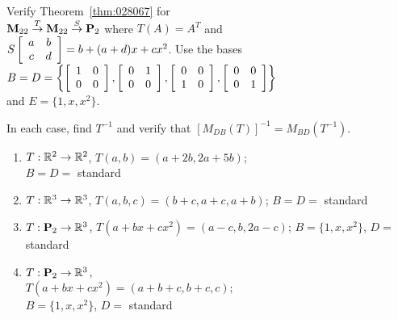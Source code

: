 \begin{multicols}{1}
\begin{ex}
Verify Theorem~\ref{thm:028067} for \\ $\textbf{M}_{22} \stackrel{T}{\to} \textbf{M}_{22} \stackrel{S}{\to} \textbf{P}_2$ where $T(A) = A^{T}$ and \\ $S \left[ \begin{array}{cc} a & b \\ c & d \end{array} \right] = b + (a + d)x + cx^2$. Use the bases \\ $B = D = \left\{ \left[ \begin{array}{rr} 1 & 0 \\ 0 & 0 \end{array} \right], \left[ \begin{array}{rr} 0 & 1 \\ 0 & 0 \end{array} \right], \left[ \begin{array}{rr} 0 & 0 \\ 1 & 0 \end{array} \right], \left[ \begin{array}{rr} 0 & 0 \\ 0 & 1 \end{array} \right] \right\}$ \\ and $E = \{1, x, x^{2}\}$.
\end{ex}

\begin{ex}
In each case, find $T^{-1}$ and verify that $[M_{DB}(T)]^{-1} = M_{BD}(T^{-1})$.


\begin{enumerate}[label={\alph*.}]
\item $T : \mathbb{R}^2 \to \mathbb{R}^2$, $T(a, b) = (a + 2b, 2a + 5b)$; \\$B = D = $ standard


\item $T : \mathbb{R}^3 \to \mathbb{R}^3$, $T(a, b, c) = (b + c, a + c, a + b)$; $B = D = $ standard


\item $T : \textbf{P}_2 \to \mathbb{R}^3$, $T(a + bx + cx^2) = (a - c, b, 2a - c)$; $B = \{1, x, x^2\}$, $D = $ standard


\item $T : \textbf{P}_2 \to \mathbb{R}^3$, \\$T(a + bx + cx^2) = (a + b + c, b + c, c)$; \\$B = \{1, x, x^2\}$, $D = $ standard



\end{enumerate}
\end{ex}
\end{multicols}
